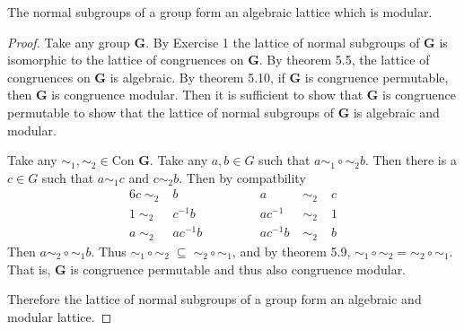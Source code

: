 \begin{theorem*}
The normal subgroups of a group form an algebraic lattice which is modular.
\end{theorem*}

\begin{proof}
Take any group $\mathbf{G}$.
By Exercise 1 the lattice of normal subgroups of $\mathbf{G}$ is isomorphic to the lattice of congruences on $\mathbf{G}$.
By theorem 5.5, the lattice of congruences on $\mathbf{G}$ is algebraic.
By theorem 5.10, if $\mathbf{G}$ is congruence permutable, then $\mathbf{G}$ is congruence modular.
Then it is sufficient to show that $\mathbf{G}$ is congruence permutable to show that the lattice of normal subgroups of $\mathbf{G}$ is algebraic and modular.

Take any $\sim_1, \sim_2 \in \text{Con }\mathbf{G}$.
Take any $a, b \in G$ such that $a \sim_1 \circ \sim_2 b$.
Then there is a $c \in G$ such that $a \sim_1 c$ and $c \sim_2 b$.
Then by compatbility
\begin{alignat*}{6}
c \;\sim_2\; & b        & \quad\quad\quad & a        & \;\sim_2\; & c \\
1 \;\sim_2\; & c^{-1}b  & \quad\quad\quad & ac^{-1}  & \;\sim_2\; & 1 \\
a \;\sim_2\; & ac^{-1}b & \quad\quad\quad & ac^{-1}b & \;\sim_2\; & b
\end{alignat*}
Then $a \sim_2 \circ \sim_1 b$.
Thus $\sim_1 \circ \sim_2 \;\subseteq\; \sim_2 \circ \sim_1$, and by theorem 5.9, $\sim_1 \circ \sim_2 = \sim_2 \circ \sim_1$.
That is, $\mathbf{G}$ is congruence permutable and thus also congruence modular.

Therefore the lattice of normal subgroups of a group form an algebraic and modular lattice.
\end{proof}